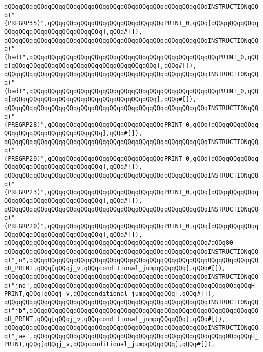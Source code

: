 \verb|qQQqqQQqqQQqqQQqqQQqqQQqqQQqqQQqqQQqqQQqqQQqqQQqqQQqqQQqINSTRUCTIONqQQq("(PREGRP35)",qQQqqQQqqQQqqQQqqQQqqQQqqQQqqQQqPRINT_0,qQQq[qQQqqQQqqQQqqQQqqQQqqQQqqQQqqQQqqQQqqQQq],qQQq#[]),|\newline
\verb|qQQqqQQqqQQqqQQqqQQqqQQqqQQqqQQqqQQqqQQqqQQqqQQqqQQqqQQqINSTRUCTIONqQQq("(bad)",qQQqqQQqqQQqqQQqqQQqqQQqqQQqqQQqqQQqqQQqqQQqqQQqqQQqPRINT_0,qQQq[qQQqqQQqqQQqqQQqqQQqqQQqqQQqqQQqqQQqqQQq],qQQq#[]),|\newline
\verb|qQQqqQQqqQQqqQQqqQQqqQQqqQQqqQQqqQQqqQQqqQQqqQQqqQQqqQQqINSTRUCTIONqQQq("(bad)",qQQqqQQqqQQqqQQqqQQqqQQqqQQqqQQqqQQqqQQqqQQqqQQqqQQqPRINT_0,qQQq[qQQqqQQqqQQqqQQqqQQqqQQqqQQqqQQqqQQqqQQq],qQQq#[]),|\newline
\verb|qQQqqQQqqQQqqQQqqQQqqQQqqQQqqQQqqQQqqQQqqQQqqQQqqQQqqQQqINSTRUCTIONqQQq("(PREGRP28)",qQQqqQQqqQQqqQQqqQQqqQQqqQQqqQQqPRINT_0,qQQq[qQQqqQQqqQQqqQQqqQQqqQQqqQQqqQQqqQQqqQQq],qQQq#[]),|\newline
\verb|qQQqqQQqqQQqqQQqqQQqqQQqqQQqqQQqqQQqqQQqqQQqqQQqqQQqqQQqINSTRUCTIONqQQq("(PREGRP29)",qQQqqQQqqQQqqQQqqQQqqQQqqQQqqQQqPRINT_0,qQQq[qQQqqQQqqQQqqQQqqQQqqQQqqQQqqQQqqQQqqQQq],qQQq#[]),|\newline
\verb|qQQqqQQqqQQqqQQqqQQqqQQqqQQqqQQqqQQqqQQqqQQqqQQqqQQqqQQqINSTRUCTIONqQQq("(PREGRP23)",qQQqqQQqqQQqqQQqqQQqqQQqqQQqqQQqPRINT_0,qQQq[qQQqqQQqqQQqqQQqqQQqqQQqqQQqqQQqqQQqqQQq],qQQq#[]),|\newline
\verb|qQQqqQQqqQQqqQQqqQQqqQQqqQQqqQQqqQQqqQQqqQQqqQQqqQQqqQQqINSTRUCTIONqQQq("(PREGRP20)",qQQqqQQqqQQqqQQqqQQqqQQqqQQqqQQqPRINT_0,qQQq[qQQqqQQqqQQqqQQqqQQqqQQqqQQqqQQqqQQqqQQq],qQQq#[]),|\newline
\verb|qQQqqQQqqQQqqQQqqQQqqQQqqQQqqQQqqQQqqQQqqQQqqQQqqQQqqQQq#qQQq80|\newline
\verb|qQQqqQQqqQQqqQQqqQQqqQQqqQQqqQQqqQQqqQQqqQQqqQQqqQQqqQQqINSTRUCTIONqQQq("jo",qQQqqQQqqQQqqQQqqQQqqQQqqQQqqQQqqQQqqQQqqQQqqQQqqQQqqQQqqQQqqQQqH_PRINT,qQQq[qQQqj_v,qQQqconditional_jumpqQQqqQQq],qQQq#[]),|\newline
\verb|qQQqqQQqqQQqqQQqqQQqqQQqqQQqqQQqqQQqqQQqqQQqqQQqqQQqqQQqINSTRUCTIONqQQq("jno",qQQqqQQqqQQqqQQqqQQqqQQqqQQqqQQqqQQqqQQqqQQqqQQqqQQqqQQqqQQqH_PRINT,qQQq[qQQqj_v,qQQqconditional_jumpqQQqqQQq],qQQq#[]),|\newline
\verb|qQQqqQQqqQQqqQQqqQQqqQQqqQQqqQQqqQQqqQQqqQQqqQQqqQQqqQQqINSTRUCTIONqQQq("jb",qQQqqQQqqQQqqQQqqQQqqQQqqQQqqQQqqQQqqQQqqQQqqQQqqQQqqQQqqQQqqQQqH_PRINT,qQQq[qQQqj_v,qQQqconditional_jumpqQQqqQQq],qQQq#[]),|\newline
\verb|qQQqqQQqqQQqqQQqqQQqqQQqqQQqqQQqqQQqqQQqqQQqqQQqqQQqqQQqINSTRUCTIONqQQq("jae",qQQqqQQqqQQqqQQqqQQqqQQqqQQqqQQqqQQqqQQqqQQqqQQqqQQqqQQqqQQqH_PRINT,qQQq[qQQqj_v,qQQqconditional_jumpqQQqqQQq],qQQq#[]),|\newline
